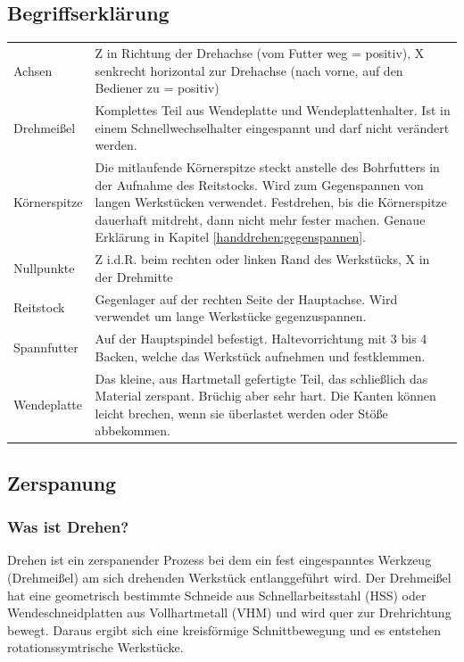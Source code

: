 \documentclass{\basedir/fablab-document}
\begin{document}
\subsection{Begriffserklärung}
\begin{tabular}{p{} p{}}
Achsen 				& Z in Richtung der Drehachse (vom Futter weg = positiv), X senkrecht horizontal zur Drehachse (nach vorne, auf den Bediener zu = positiv) \\
Drehmeißel 		& Komplettes Teil aus Wendeplatte und Wendeplattenhalter. Ist in einem Schnell\-wechsel\-halter eingespannt und darf nicht verändert werden. \\
Körnerspitze 	& Die mitlaufende Körnerspitze steckt anstelle des Bohrfutters in der Aufnahme des Reitstocks. Wird zum Gegenspannen von langen Werkstücken verwendet. Festdrehen, bis die Körnerspitze dauerhaft mitdreht, dann nicht mehr fester machen. Genaue Erklärung in Kapitel \ref{handdrehen:gegenspannen}. \\
Nullpunkte 		& Z i.d.R. beim rechten oder linken Rand des Werkstücks, X in der Drehmitte \\
Reitstock 		& Gegenlager auf der rechten Seite der Hauptachse. Wird verwendet um lange Werkstücke gegenzuspannen. \\
Spannfutter 	& Auf der Hauptspindel befestigt. Haltevorrichtung mit 3 bis 4 Backen, welche das Werkstück aufnehmen und festklemmen. \\
Wendeplatte 	& Das kleine, aus Hartmetall gefertigte Teil, das schließlich das Material zerspant. Brüchig aber sehr hart. Die Kanten können leicht brechen, wenn sie überlastet werden oder Stöße abbekommen. \\
\end{tabular}

\subsection{Zerspanung}
\subsubsection{Was ist Drehen?}
Drehen ist ein zerspanender Prozess bei dem ein fest eingespanntes Werkzeug (Drehmeißel) am sich drehenden Werkstück entlanggeführt wird.
Der Drehmeißel hat eine geometrisch bestimmte Schneide aus Schnellarbeitsstahl (HSS) oder Wendeschneidplatten aus Vollhartmetall (VHM) und wird quer zur Drehrichtung bewegt.
Daraus ergibt sich eine kreisförmige Schnittbewegung und es entstehen rotationssymtrische Werkstücke.
\end{document}
